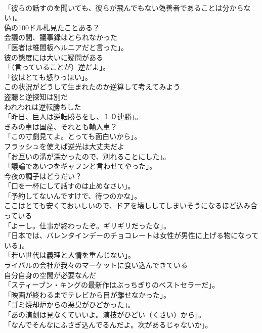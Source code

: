 \documentclass[8pt]{extreport}
\begin{document}
\begin{CJK}{UTF8}{min}
\\	「彼らの話すのを聞いても、彼らが飛んでもない偽善者であることは分からない」。	
\\	偽の100ドル札見たことある？	
\\	会議の間、議事録はとられなかった	
\\	「医者は椎間板ヘルニアだと言った」。	
\\	彼の態度には大いに疑問がある	
\\	「（言っていることが）逆だよ」。	
\\	「彼はとても怒りっぽい」。	
\\	この状況がどうして生まれたのか逆算して考えてみよう	
\\	盗聴と逆探知は別だ	
\\	われわれは逆転勝ちした	
\\	「昨日、巨人は逆転勝ちをし、１０連勝」。	
\\	きみの車は国産、それとも輸入車？	
\\	「この寸劇見てよ。とっても面白いから」。	
\\	フラッシュを使えば逆光は大丈夫だよ	
\\	「お互いの溝が深かったので、別れることにした」。	
\\	「議論であいつをギャフンと言わせてやった」。	
\\	今夜の調子はどうだい？	
\\	「口を一杯にして話すのは止めなさい」。	
\\	「予約してないんですけで、待つのかな」。	
\\	ここはとても安くておいしいので、ドアを壊ししてしまいそうになるほど込み合っている	
\\	「よーし。仕事が終わったぞ。ギリギリだったな」。	
\\	「日本では、バレンタインデーのチョコレートは女性が男性に上げる物になっている」。	
\\	「若い世代は義理と人情を重んじない」。	
\\	ライバルの会社が我々のマーケットに食い込んできている	
\\	自分自身の空間が必要なんだ	
\\	「スティーブン・キングの最新作はぶっちぎりのベストセラーだ」。	
\\	「映画が終わるまでテレビから目が離せなかった」。	
\\	「ゴミ焼却炉からの悪臭がひどかった」。	
\\	「あの演劇は見なくていいよ。演技がひどい（くさい）から」。	
\\	「なんでそんなにふさぎ込んでるんだよ。次があるじゃないか」。	

\end{CJK}
\end{document}
